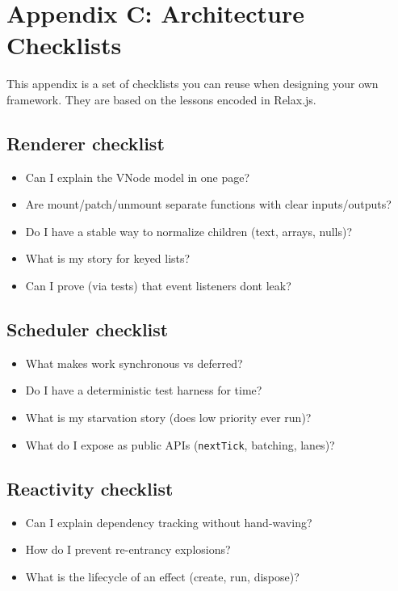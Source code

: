 \chapter{Appendix C: Architecture Checklists}

This appendix is a set of checklists you can reuse when designing your own framework.
They are based on the lessons encoded in Relax.js.

\section{Renderer checklist}
\begin{itemize}
  \item Can I explain the VNode model in one page?
  \item Are mount/patch/unmount separate functions with clear inputs/outputs?
  \item Do I have a stable way to normalize children (text, arrays, nulls)?
  \item What is my story for keyed lists?
  \item Can I prove (via tests) that event listeners don\textquotesingle t leak?
\end{itemize}

\section{Scheduler checklist}
\begin{itemize}
  \item What makes work synchronous vs deferred?
  \item Do I have a deterministic test harness for time?
  \item What is my starvation story (does low priority ever run)?
  \item What do I expose as public APIs (\texttt{nextTick}, batching, lanes)?
\end{itemize}

\section{Reactivity checklist}
\begin{itemize}
  \item Can I explain dependency tracking without hand-waving?
  \item How do I prevent re-entrancy explosions?
  \item What is the lifecycle of an effect (create, run, dispose)?
\end{itemize}

